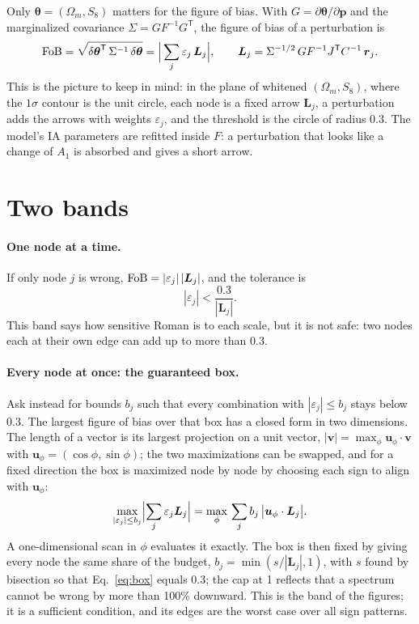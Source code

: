 \documentclass[11pt]{article}
\newcommand{\FoB}{{\rm FoB}}
\newcommand{\T}{^{\mathsf{T}}}
\newcommand{\bvec}[1]{\boldsymbol{#1}}
\begin{document}
Only $\bvec\theta = (\Omega_m, S_8)$ matters for the figure of bias. With
$G = \partial\bvec\theta/\partial\bvec p$ and the marginalized covariance
$\Sigma = G F^{-1} G\T$, the figure of bias of a perturbation is
\begin{equation}
  \FoB = \sqrt{\delta\bvec\theta\T\,\Sigma^{-1}\,\delta\bvec\theta}
  = \Bigl|\, \sum_j \varepsilon_j\, \bvec L_j \Bigr|,
  \qquad
  \bvec L_j = \Sigma^{-1/2}\, G F^{-1} J\T C^{-1}\, \bvec r_j .
  \label{eq:fob}
\end{equation}
This is the picture to keep in mind: in the plane of whitened $(\Omega_m,
S_8)$, where the $1\sigma$ contour is the unit circle, each node is a fixed
arrow $\bvec L_j$, a perturbation adds the arrows with weights
$\varepsilon_j$, and the threshold is the circle of radius 0.3. The
model's IA parameters are refitted inside $F$: a perturbation that looks
like a change of $A_1$ is absorbed and gives a short arrow.

\section{Two bands}
\label{sec:bands}

\paragraph{One node at a time.}
If only node $j$ is wrong, $\FoB = |\varepsilon_j|\,|\bvec L_j|$, and the
tolerance is
\begin{equation}
  |\varepsilon_j| < \frac{0.3}{|\bvec L_j|}.
\end{equation}
This band says how sensitive Roman is to each scale, but it is not safe:
two nodes each at their own edge can add up to more than 0.3.

\paragraph{Every node at once: the guaranteed box.}
Ask instead for bounds $b_j$ such that every combination with
$|\varepsilon_j| \le b_j$ stays below 0.3. The largest figure of bias over
that box has a closed form in two dimensions. The length of a vector is
its largest projection on a unit vector, $|\bvec v| = \max_{\phi}
\bvec u_\phi\cdot\bvec v$ with $\bvec u_\phi = (\cos\phi, \sin\phi)$; the two
maximizations can be swapped, and for a fixed direction the box is
maximized node by node by choosing each sign to align with $\bvec u_\phi$:
\begin{equation}
  \max_{|\varepsilon_j| \le b_j} \Bigl|\sum_j \varepsilon_j \bvec L_j\Bigr|
  = \max_{\phi}\, \sum_j b_j\, \bigl|\bvec u_\phi\cdot\bvec L_j\bigr| .
  \label{eq:box}
\end{equation}
A one-dimensional scan in $\phi$ evaluates it exactly. The box is then
fixed by giving every node the same share of the budget, $b_j =
\min(s/|\bvec L_j|, 1)$, with $s$ found by bisection so that
Eq.~\eqref{eq:box} equals 0.3; the cap at 1 reflects that a spectrum
cannot be wrong by more than 100\% downward. This is the band of the
figures; it is a sufficient condition, and its edges are the worst case
over all sign patterns.
\end{document}
